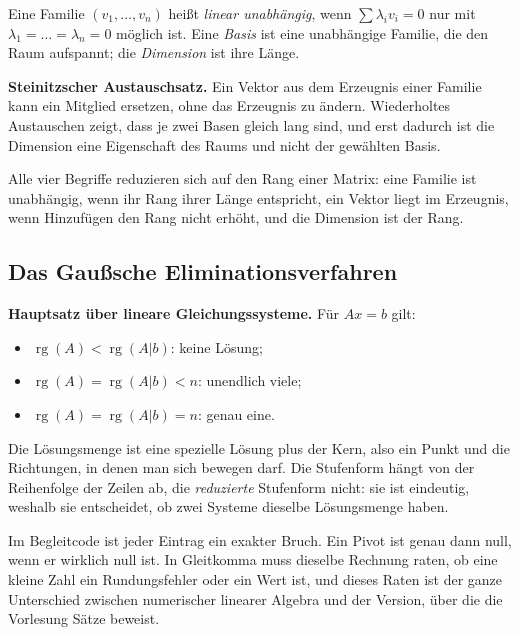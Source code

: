\documentclass[12pt, a4paper]{article}
\begin{document}
\begin{definitionbox}
Eine Familie $(v_1, \dots, v_n)$ heißt \emph{linear unabhängig}, wenn
$\sum \lambda_i v_i = 0$ nur mit $\lambda_1 = \dots = \lambda_n = 0$ möglich
ist. Eine \emph{Basis} ist eine unabhängige Familie, die den Raum aufspannt;
die \emph{Dimension} ist ihre Länge.
\end{definitionbox}

\textbf{Steinitzscher Austauschsatz.} Ein Vektor aus dem Erzeugnis einer
Familie kann ein Mitglied ersetzen, ohne das Erzeugnis zu ändern. Wiederholtes
Austauschen zeigt, dass je zwei Basen gleich lang sind, und erst dadurch ist
die Dimension eine Eigenschaft des Raums und nicht der gewählten Basis.

Alle vier Begriffe reduzieren sich auf den Rang einer Matrix: eine Familie ist
unabhängig, wenn ihr Rang ihrer Länge entspricht, ein Vektor liegt im
Erzeugnis, wenn Hinzufügen den Rang nicht erhöht, und die Dimension ist der
Rang.

\subsection{Das Gaußsche Eliminationsverfahren}

\begin{definitionbox}
\textbf{Hauptsatz über lineare Gleichungssysteme.} Für $Ax = b$ gilt:
\begin{itemize}
  \item $\operatorname{rg}(A) < \operatorname{rg}(A|b)$: keine Lösung;
  \item $\operatorname{rg}(A) = \operatorname{rg}(A|b) < n$: unendlich viele;
  \item $\operatorname{rg}(A) = \operatorname{rg}(A|b) = n$: genau eine.
\end{itemize}
\end{definitionbox}

Die Lösungsmenge ist eine spezielle Lösung plus der Kern, also ein Punkt und
die Richtungen, in denen man sich bewegen darf. Die Stufenform hängt von der
Reihenfolge der Zeilen ab, die \emph{reduzierte} Stufenform nicht: sie ist
eindeutig, weshalb sie entscheidet, ob zwei Systeme dieselbe Lösungsmenge
haben.

\begin{notebox}
Im Begleitcode ist jeder Eintrag ein exakter Bruch. Ein Pivot ist genau dann
null, wenn er wirklich null ist. In Gleitkomma muss dieselbe Rechnung raten,
ob eine kleine Zahl ein Rundungsfehler oder ein Wert ist, und dieses Raten
ist der ganze Unterschied zwischen numerischer linearer Algebra und der
Version, über die die Vorlesung Sätze beweist.
\end{notebox}
\end{document}
